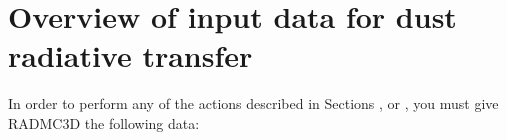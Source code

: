 \documentclass[letterpaper,10pt,english]{sphinxmanual}
\begin{document}
\section{Overview of input data for dust radiative transfer}
\label{\detokenize{dustradtrans:overview-of-input-data-for-dust-radiative-transfer}}
In order to perform any of the actions described in Sections
{\hyperref[\detokenize{dustradtrans:sec-dust-thermal-monte-carlo}]{}}, {\hyperref[\detokenize{dustradtrans:sec-dust-monochromatic-monte-carlo}]{}}
or {\hyperref[\detokenize{dustradtrans:sec-dust-ray-tracing}]{}}, you must give RADMC\sphinxhyphen{}3D the following
data:
\end{document}
